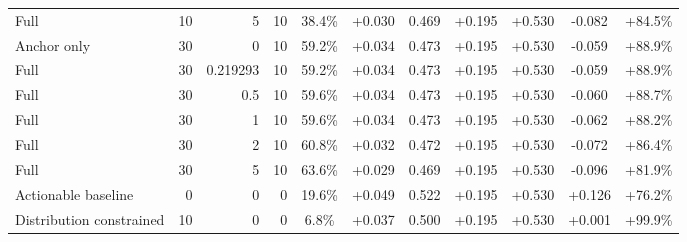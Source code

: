 \begin{table}[htbp]
\begin{tabular}{lrrrccccccc}
Full & 10 & 5 & 10 & 38.4\% & +0.030 & 0.469 & +0.195 & +0.530 & -0.082 & +84.5\% \\
Anchor only & 30 & 0 & 10 & 59.2\% & +0.034 & 0.473 & +0.195 & +0.530 & -0.059 & +88.9\% \\
Full & 30 & 0.219293 & 10 & 59.2\% & +0.034 & 0.473 & +0.195 & +0.530 & -0.059 & +88.9\% \\
Full & 30 & 0.5 & 10 & 59.6\% & +0.034 & 0.473 & +0.195 & +0.530 & -0.060 & +88.7\% \\
Full & 30 & 1 & 10 & 59.6\% & +0.034 & 0.473 & +0.195 & +0.530 & -0.062 & +88.2\% \\
Full & 30 & 2 & 10 & 60.8\% & +0.032 & 0.472 & +0.195 & +0.530 & -0.072 & +86.4\% \\
Full & 30 & 5 & 10 & 63.6\% & +0.029 & 0.469 & +0.195 & +0.530 & -0.096 & +81.9\% \\
Actionable baseline & 0 & 0 & 0 & 19.6\% & +0.049 & 0.522 & +0.195 & +0.530 & +0.126 & +76.2\% \\
Distribution constrained & 10 & 0 & 0 & 6.8\% & +0.037 & 0.500 & +0.195 & +0.530 & +0.001 & +99.9\% \\
\bottomrule
\end{tabular}
\end{table}